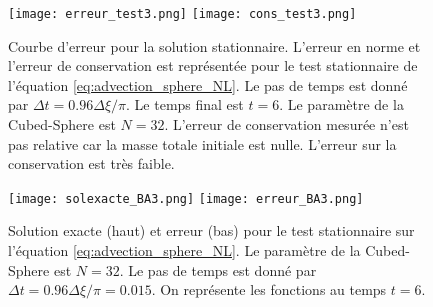 \begin{figure}[htbp]
\begin{center}
\texttt{[image: erreur\_test3.png]}
\texttt{[image: cons\_test3.png]}
\end{center}
\caption{Courbe d'erreur pour la solution stationnaire. L'erreur en norme et l'erreur de conservation est représentée pour le test stationnaire de l'équation \eqref{eq:advection_sphere_NL}. Le pas de temps est donné par $\Delta t = 0.96 \Delta \xi / \pi$. Le temps final est $t=6$. Le paramètre de la Cubed-Sphere est $N=32$. L'erreur de conservation mesurée n'est pas relative car la masse totale initiale est nulle. L'erreur sur la conservation est très faible.}
\label{fig:benartzi_test3_hist}
\end{figure}

\begin{figure}[htbp]
\begin{center}
\texttt{[image: solexacte\_BA3.png]}
\texttt{[image: erreur\_BA3.png]}
\end{center}
\caption{Solution exacte (haut) et erreur (bas) pour le test stationnaire sur l'équation \eqref{eq:advection_sphere_NL}. Le paramètre de la Cubed-Sphere est $N=32$. Le pas de temps est donné par $\Delta t = 0.96 \Delta \xi / \pi = 0.015$. On représente les fonctions au temps $t=6$.}
\label{fig:benartzi_test3_sol}
\end{figure}


















